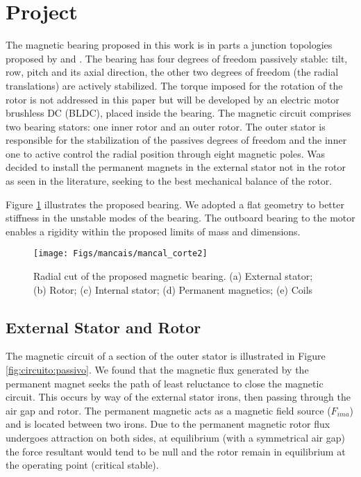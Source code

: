 \documentclass[10pt,fleqn,a4paper,twoside]{article}
\begin{document}

\section{Project}

The magnetic bearing proposed in this work is in parts a junction topologies proposed by \cite{Bernus1998} and \cite{Scharfe2001}. The bearing has four degrees of freedom passively stable: tilt, row, pitch and its axial direction, the other two degrees of freedom (the radial translations) are actively stabilized. The torque imposed for the rotation of the rotor is not addressed in this paper but will be developed by an electric motor brushless DC (BLDC), placed inside the bearing. The magnetic circuit comprises two bearing stators: one inner rotor and an outer rotor. The outer stator is responsible for the stabilization of the passives degrees of freedom and the inner one to active control the radial position through eight magnetic poles. Was decided to install the permanent magnets in the external stator not in the rotor as seen in the literature, seeking to the best mechanical balance of the rotor.

Figure \ref{fig:mancal:corte} illustrates the proposed bearing. We adopted a flat geometry to better stiffness in the unstable modes of the bearing. The outboard bearing to the motor enables a rigidity within the proposed limits of mass and dimensions.

\begin{figure}[ht]
\centering
\texttt{[image: Figs/mancais/mancal\_corte2]}
\caption{Radial cut of the proposed magnetic bearing. (a) External stator; (b) Rotor; (c) Internal stator; (d) Permanent magnetics; (e) Coils}
\label{fig:mancal:corte}
\end{figure}

\subsection{External Stator and Rotor}

The magnetic circuit of a section of the outer stator is illustrated in Figure \ref{fig:circuito:passivo}. We found that the magnetic flux generated by the permanent magnet seeks the path of least reluctance to close the magnetic circuit. This occurs by way of the external stator irons, then passing through the air gap and rotor. The permanent magnetic acts as a magnetic field source ($ F_ {ima} $) and is located between two irons. Due to the permanent magnetic rotor flux undergoes attraction on both sides, at equilibrium (with a symmetrical air gap) the force resultant would tend to be null and the rotor remain in equilibrium at the operating point (critical stable). 
\end{document}
